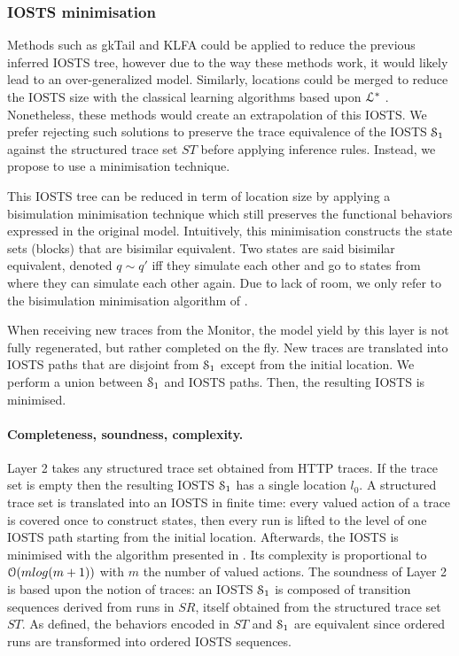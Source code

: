 
\subsubsection{IOSTS minimisation}

Methods such as gkTail and KLFA could be applied to reduce the
previous inferred IOSTS tree, however due to the way these
methods work, it would likely lead to an over-generalized model.
Similarly, locations could be merged to reduce the IOSTS size
with the classical learning algorithms based upon
$\EuScript{L}^*$ \cite{Angluin198787,lambeau08}. Nonetheless,
these methods would create an extrapolation of this IOSTS. We
prefer rejecting such solutions to preserve the trace equivalence
of the IOSTS $\EuScript{S}_1$ against the structured trace set
$ST$ before applying inference rules. Instead, we propose to use
a minimisation technique.

This IOSTS tree can be reduced in term of location size by
applying a bisimulation minimisation technique which still
preserves the functional behaviors expressed in the original
model.  Intuitively, this minimisation constructs the state sets
(blocks) that are bisimilar equivalent. Two states are said
bisimilar equivalent, denoted $q \sim q'$ iff they simulate each
other and go to states from where they can simulate each other
again. Due to lack of room, we only refer to the bisimulation
minimisation algorithm of \cite{Fernandez89animplementation}.

When receiving new traces from the Monitor, the model yield by
this layer is not fully regenerated, but rather completed on the
fly. New traces are translated into IOSTS paths that are disjoint
from $\EuScript{S}_1$ except from the initial location. We
perform a union between $\EuScript{S}_1$ and IOSTS paths. Then,
the resulting IOSTS is minimised.

\paragraph{Completeness, soundness, complexity.}


Layer 2 takes any structured trace set obtained from HTTP traces.
If the trace set is empty then the resulting IOSTS
$\EuScript{S}_1$ has a single location $l_0$. A structured trace
set is translated into an IOSTS in finite time: every valued
action of a trace is covered once to construct states, then every
run is lifted to the level of one IOSTS path starting from the
initial location. Afterwards, the IOSTS is minimised with the
algorithm presented in \cite{Fernandez89animplementation}. Its
complexity is proportional to $\EuScript{O}(mlog (m+1))$ with $m$
the number of valued actions. The soundness of Layer 2 is based
upon the notion of traces: an IOSTS $\EuScript{S}_1$ is composed
of transition sequences derived from runs in $SR$, itself
obtained from the structured trace set $ST$. As defined, the
behaviors encoded in $ST$ and $\EuScript{S}_1$ are equivalent
since ordered runs are transformed into ordered IOSTS sequences.

